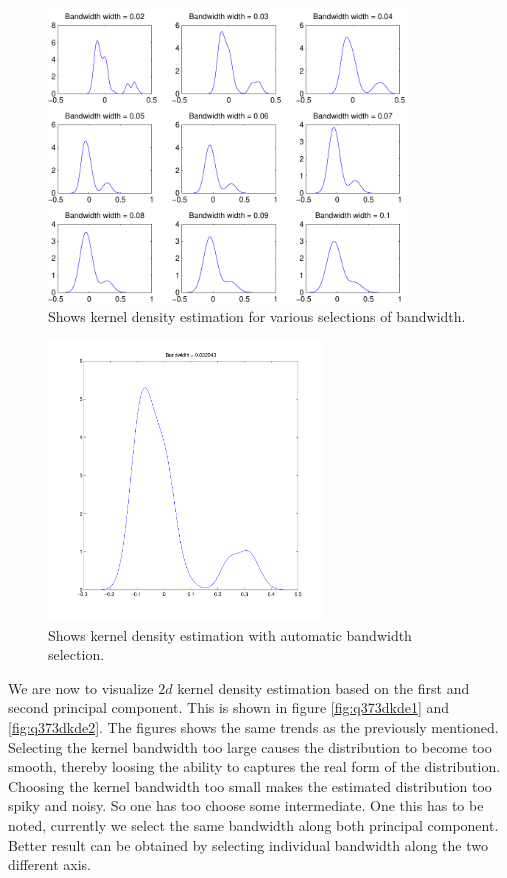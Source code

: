 \begin{figure}[!htbp]
  \centering
  \includegraphics[width=0.85\textwidth]{./images/q37kde}
  \caption{Shows kernel density estimation for various selections of
    bandwidth.}
  \label{fig:q37kde}
\end{figure}

\begin{figure}[!htbp]
  \centering
  \includegraphics[width=0.65\textwidth]{./images/q37kdeauto}
  \caption{Shows kernel density estimation with automatic bandwidth
    selection.}
  \label{fig:q37kdeauto}
\end{figure}

\newpage

We are now to visualize $2d$ kernel density estimation based on the
first and second principal component. This is shown in figure
\ref{fig:q373dkde1} and \ref{fig:q373dkde2}. The figures shows the
same trends as the previously mentioned. Selecting the kernel
bandwidth too large causes the distribution to become too smooth,
thereby loosing the ability to captures the real form of the
distribution. Choosing the kernel bandwidth too small makes the
estimated distribution too spiky and noisy. So one has too choose some
intermediate. One this has to be noted, currently we select the same
bandwidth along both principal component. Better result can be
obtained by selecting individual bandwidth along the two different
axis.

